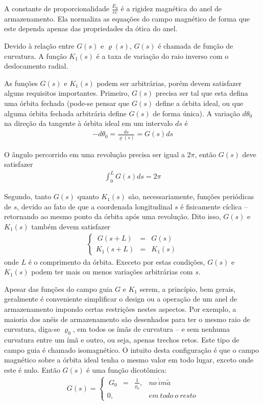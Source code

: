 A constante de proporcionalidade $\frac{E_0}{ec}$ é a rigidez magnética do anel de armazenamento. Ela normaliza as equações do campo magnético de forma que este dependa apenas das propriedades da ótica do anel.

Devido à relação entre $G(s)$ e $\varrho(s)$, $G(s)$ é chamada de função de curvatura. A função $K_1(s)$ é a taxa de variação do raio inverso com o deslocamento radial.

As funções $G(s)$ e $K_1(s)$ podem ser arbitrárias, porém devem satisfazer alguns requisitos importantes. Primeiro, $G(s)$ precisa ser tal que esta defina uma órbita fechada (pode-se pensar que $G(s)$ define a órbita ideal, ou que alguma órbita fechada arbitrária define $G(s)$ de forma única). A variação $d \theta_0$ na direção da tangente à órbita ideal em um intervalo $ds$ é
\begin{align}
	-d\theta_0 = \frac{ds}{\varrho(s)} = G(s)ds
\end{align}

O ângulo percorrido em uma revolução precisa ser igual a $2\pi$, então $G(s)$ deve satisfazer
\begin{align}
	\int_{0}^{L} G(s)ds = 2\pi
\end{align}

Segundo, tanto $G(s)$ quanto $K_1(s)$ são, necessariamente, funções periódicas de $s$, devido ao fato de que a coordenada longitudinal $s$ é fisicamente cíclica -- retornando ao mesmo ponto da órbita após uma revolução. Dito isso, $G(s)$ e $K_1(s)$ também devem satisfazer
\begin{align}
	\left\{\begin{array}{rcl}
	\ G(s+L) & = & G(s)\\
	K_1(s+L) & = & K_1(s)
	\end{array}\right.
\end{align}
onde $L$ é o comprimento da órbita. Execeto por estas condições, $G(s)$ e $K_1(s)$ podem ter mais ou menos variações arbitrárias com $s$.

Apesar das funções do campo guia $G$ e $K_1$ serem, a princípio, bem gerais, geralmente é conveniente simplificar o design ou a operação de um anel de armazenamento impondo certas restrições nestes aspectos. Por exemplo, a maioria dos anéis de armazenamento são desenhados para ter o mesmo raio de curvatura, diga-se $\varrho_0$, em todos os ímãs de curvatura -- e sem nenhuma curvatura entre um ímã e outro, ou seja, apenas trechos retos. Este tipo de campo guia é chamado isomagnético. O intuito desta configuração é que o campo magnético sobre a órbita ideal tenha o mesmo valor em todo lugar, exceto onde este é nulo. Então $G(s)$ é uma função dicotômica:
\begin{align}
	G(s) = \left\{\begin{array}{rrrr}
	\ G_0 & = & \frac{1}{\varrho_0}, &  no\ \acute{i}m\tilde{a}\\
	0, & & & em\ todo\ o\ resto
	\end{array}\right.
\end{align}

